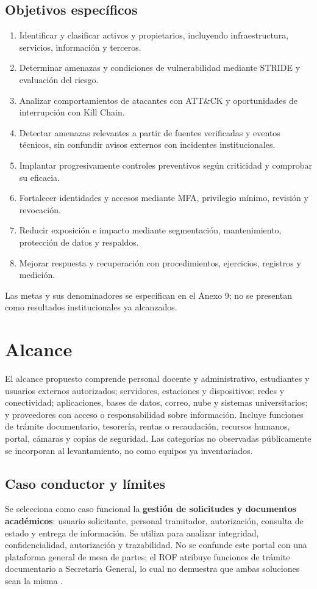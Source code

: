 \documentclass[10pt,a4paper]{article}
\begin{document}
\subsection{Objetivos específicos}
\begin{enumerate}
\item Identificar y clasificar activos y propietarios, incluyendo infraestructura, servicios, información y terceros.
\item Determinar amenazas y condiciones de vulnerabilidad mediante STRIDE y evaluación del riesgo.
\item Analizar comportamientos de atacantes con ATT\&CK y oportunidades de interrupción con Kill Chain.
\item Detectar amenazas relevantes a partir de fuentes verificadas y eventos técnicos, sin confundir avisos externos con incidentes institucionales.
\item Implantar progresivamente controles preventivos según criticidad y comprobar su eficacia.
\item Fortalecer identidades y accesos mediante MFA, privilegio mínimo, revisión y revocación.
\item Reducir exposición e impacto mediante segmentación, mantenimiento, protección de datos y respaldos.
\item Mejorar respuesta y recuperación con procedimientos, ejercicios, registros y medición.
\end{enumerate}
Las metas y sus denominadores se especifican en el Anexo 9; no se presentan como resultados institucionales ya alcanzados.

\section{Alcance}
El alcance propuesto comprende personal docente y administrativo, estudiantes y usuarios externos autorizados; servidores, estaciones y dispositivos; redes y conectividad; aplicaciones, bases de datos, correo, nube y sistemas universitarios; y proveedores con acceso o responsabilidad sobre información. Incluye funciones de trámite documentario, tesorería, rentas o recaudación, recursos humanos, portal, cámaras y copias de seguridad. Las categorías no observadas públicamente se incorporan al levantamiento, no como equipos ya inventariados.

\subsection{Caso conductor y límites}
Se selecciona como caso funcional la \textbf{gestión de solicitudes y documentos académicos}: usuario solicitante, personal tramitador, autorización, consulta de estado y entrega de información. Se utiliza para analizar integridad, confidencialidad, autorización y trazabilidad. No se confunde este portal con una plataforma general de mesa de partes; el ROF atribuye funciones de trámite documentario a Secretaría General, lo cual no demuestra que ambas soluciones sean la misma \cite{R02}.
\end{document}
